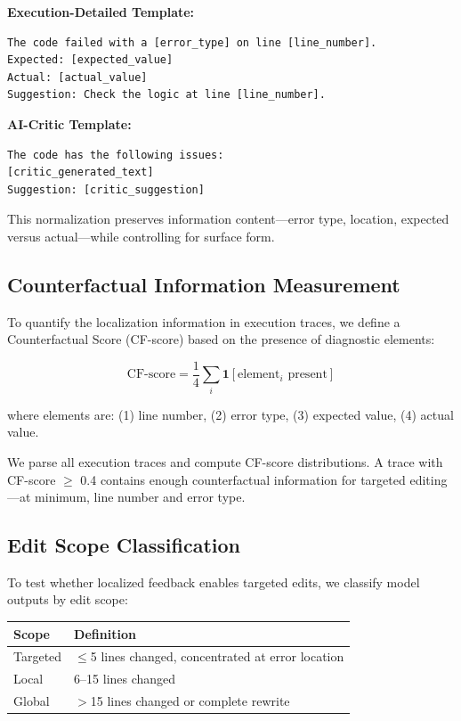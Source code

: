 \textbf{Execution-Detailed Template:}
\begin{verbatim}
The code failed with a [error_type] on line [line_number].
Expected: [expected_value]
Actual: [actual_value]
Suggestion: Check the logic at line [line_number].
\end{verbatim}

\textbf{AI-Critic Template:}
\begin{verbatim}
The code has the following issues:
[critic_generated_text]
Suggestion: [critic_suggestion]
\end{verbatim}

This normalization preserves information content---error type, location, expected versus actual---while controlling for surface form.

\subsection{Counterfactual Information Measurement}

To quantify the localization information in execution traces, we define a Counterfactual Score (CF-score) based on the presence of diagnostic elements:

\begin{equation}
\text{CF-score} = \frac{1}{4}\sum_{i} \mathbf{1}[\text{element}_i \text{ present}]
\end{equation}

where elements are: (1) line number, (2) error type, (3) expected value, (4) actual value.

We parse all execution traces and compute CF-score distributions. A trace with CF-score $\geq$ 0.4 contains enough counterfactual information for targeted editing---at minimum, line number and error type.

\subsection{Edit Scope Classification}

To test whether localized feedback enables targeted edits, we classify model outputs by edit scope:

\begin{table}[h]
\centering
\begin{tabular}{ll}
\toprule
\textbf{Scope} & \textbf{Definition} \\
\midrule
Targeted & $\leq$5 lines changed, concentrated at error location \\
Local & 6--15 lines changed \\
Global & $>$15 lines changed or complete rewrite \\
\bottomrule
\end{tabular}
\end{table}

